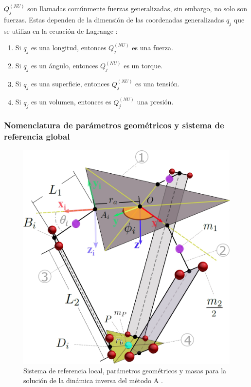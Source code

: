     \newpage
    
    
     $ Q_{j}^{ \left( NU \right) }$ son llamadas comúnmente fuerzas generalizadas, sin embargo, no solo son fuerzas. Estas dependen de la dimensión de las coordenadas generalizadas  $ q_{j}$ que se utiliza en la ecuación de Lagrange :
    
    \begin{enumerate}
    	\item Si $q_{j}$  es una longitud, entonces $Q_{j}^{ \left( NU \right)}$  es una fuerza.
    	\item Si  $q_{j}$  es un ángulo, entonces  $Q_{j}^{ \left( NU \right) }$  es un torque.
        \item Si  $q_{j}$  es una superficie, entonces  $Q_{j}^{ \left( NU \right) }$ es una tensión.
    	\item Si $q_{j}$ es un volumen, entonces es $Q_{j}^{ \left( NU \right) }$ una presión.
    \end{enumerate}

    \newpage


    \subsubsection{Nomenclatura de parámetros geométricos y sistema de referencia global}
    
            \begin{figure}[htb]
                 \centering
                 \includegraphics[width=0.77\linewidth]{Main/Chapter4/Images4/DIBUJO23.jpg}
                  \caption{Sistema de referencia local, parámetros geométricos y masas para la solución de la dinámica inversa del método A \cite{Clavel:31403}.}
                  \label{f:Cap4_Metodo_A_dina_1}
            \end{figure}    

